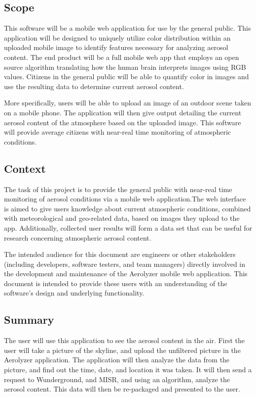 \documentclass[onecolumn, draftclsnofoot,10pt, compsoc]{IEEEtran}
\begin{document}
\begin{flushleft}
\subsection{Scope }
This software will be a mobile web application for use by the general public. 
This application will be designed to uniquely utilize color distribution within an uploaded mobile image to identify features necessary for analyzing aerosol content. 
The end product will be a full mobile web app that employs an open source algorithm translating how the human brain interprets images using RGB values. 
Citizens in the general public will be able to quantify color in images and use the resulting data to determine current aerosol content. 

\medskip %

More specifically, users will be able to upload an image of an outdoor scene taken on a mobile phone. 
The application will then give output detailing the current aerosol content of the atmosphere based on the uploaded image. 
This software will provide average citizens with near-real time monitoring of atmospheric conditions.

\subsection{Context}
The task of this project is to provide the general public with near-real time monitoring of aerosol conditions via a mobile web application.The web interface is aimed to give users knowledge about current atmospheric conditions, combined with meteorological and geo-related data, based on images they upload to the app. Additionally, collected user results will form a data set that can be useful for research concerning atmospheric aerosol content. 

\medskip

The intended audience for this document are engineers or other stakeholders (including developers, software testers, and team managers) directly involved in the development and maintenance of the Aerolyzer mobile web application. This document is intended to provide these users with an understanding of the software’s design and underlying functionality.

\subsection{Summary}
The user will use this application to see the aerosol content in the air. First the user will take a picture of the skyline, and upload the unfiltered picture in the Aerolyzer application. The application will then analyze the data from the picture, and find out the time, date, and location it was taken. It will then send a request to Wunderground, and MISR, and using an algorithm, analyze the aerosol content. This data will then be re-packaged and presented to the user. 


\end{flushleft}
\end{document}
